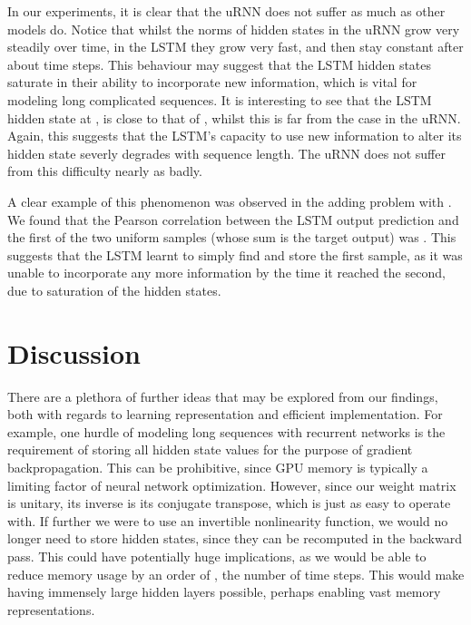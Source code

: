 \documentclass{article}
\begin{document}
In our experiments, it is clear that the uRNN does not suffer as much as other models do.
Notice that whilst the norms of hidden states in the uRNN grow very steadily over time, in the LSTM
they grow very fast, and then stay constant after about  time steps. This behaviour may
suggest that the LSTM hidden states saturate in their ability to incorporate new information, which is vital
for modeling long complicated sequences. It is interesting to see that the LSTM hidden state at , 
is close to that of , whilst this is far from the case in the uRNN. Again, this suggests that
the LSTM's capacity to use new information to alter its hidden state severly degrades with sequence length.
The uRNN does not suffer from this difficulty nearly as badly. 

A clear example of this phenomenon was observed in the adding problem with . We found that the 
Pearson correlation between the LSTM output prediction and the first of the two uniform samples (whose 
sum is the target output) was . This suggests that the LSTM learnt to simply find and store the 
first sample, as it was unable to 
incorporate any more information by the time it reached the second, due to 
saturation of the hidden states.   

\vspace{-2.5mm}
\section{Discussion}
\vspace{-1mm}
There are a plethora of further ideas that may be explored from our findings, both with regards to 
learning representation and efficient implementation. For example, one hurdle of modeling long sequences 
with recurrent networks is the requirement of storing all hidden state values for the purpose of gradient
backpropagation. This can be prohibitive, since GPU memory is typically a limiting factor of neural network 
optimization. However, since our weight matrix is unitary, its inverse is its conjugate transpose, 
which is just as easy to operate with. If further we were to use an invertible nonlinearity function, we would 
no longer need to store hidden states, since they can be recomputed in the backward pass. This could have 
potentially huge implications, as we would be able to reduce memory usage by an order of , the number of
time steps. This would make having immensely large hidden layers possible, perhaps enabling vast memory representations.
\end{document}
